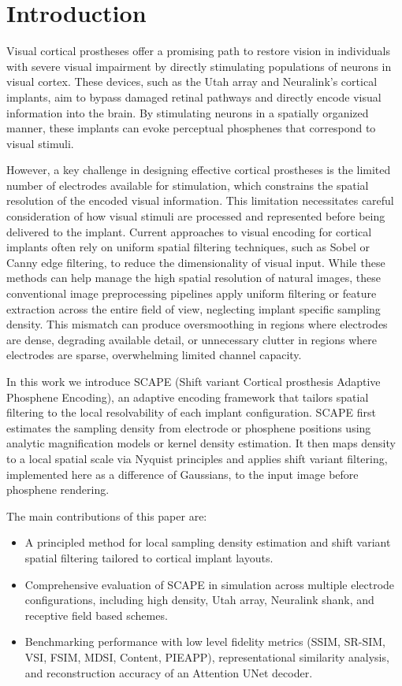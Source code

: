\section{Introduction}
Visual cortical prostheses offer a promising path to restore vision in individuals with severe visual impairment by directly stimulating populations of neurons in visual cortex. These devices, such as the Utah array and Neuralink's cortical implants, aim to bypass damaged retinal pathways and directly encode visual information into the brain. By stimulating neurons in a spatially organized manner, these implants can evoke perceptual phosphenes that correspond to visual stimuli.

However, a key challenge in designing effective cortical prostheses is the limited number of electrodes available for stimulation, which constrains the spatial resolution of the encoded visual information. This limitation necessitates careful consideration of how visual stimuli are processed and represented before being delivered to the implant.
Current approaches to visual encoding for cortical implants often rely on uniform spatial filtering techniques, such as Sobel or Canny edge filtering, to reduce the dimensionality of visual input. While these methods can help manage the high spatial resolution of natural images, these conventional image preprocessing pipelines apply uniform filtering or feature extraction across the entire field of view, neglecting implant specific sampling density. This mismatch can produce oversmoothing in regions where electrodes are dense, degrading available detail, or unnecessary clutter in regions where electrodes are sparse, overwhelming limited channel capacity.

In this work we introduce SCAPE (Shift variant Cortical prosthesis Adaptive Phosphene Encoding), an adaptive encoding framework that tailors spatial filtering to the local resolvability of each implant configuration. SCAPE first estimates the sampling density from electrode or phosphene positions using analytic magnification models or kernel density estimation. It then maps density to a local spatial scale via Nyquist principles and applies shift variant filtering, implemented here as a difference of Gaussians, to the input image before phosphene rendering. 

The main contributions of this paper are:
\begin{itemize}
  \item A principled method for local sampling density estimation and shift variant spatial filtering tailored to cortical implant layouts.
  \item Comprehensive evaluation of SCAPE in simulation across multiple electrode configurations, including high density, Utah array, Neuralink shank, and receptive field based schemes.
  \item Benchmarking performance with low level fidelity metrics (SSIM, SR-SIM, VSI, FSIM, MDSI, Content, PIEAPP), representational similarity analysis, and reconstruction accuracy of an Attention UNet decoder.
\end{itemize}
